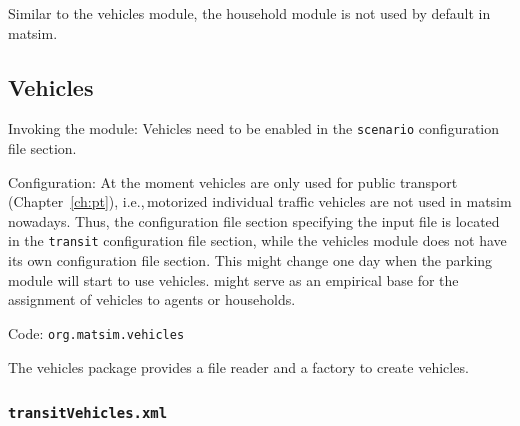 Similar to the vehicles module, the household module is not used by default in \gls{matsim}.

\subsection{Vehicles}
\label{sec:vehicles}


\begin{compactitem}
\item Invoking the module: Vehicles need to be enabled in the \lstinline|scenario| configuration file section.
\item Configuration: At the moment vehicles are only used for public transport (Chapter~\ref{ch:pt}), i.e.,\,motorized individual traffic vehicles are not used in \gls{matsim} nowadays. Thus, the configuration file section specifying the input file is located in the \lstinline|transit| configuration file section, while the vehicles module does not have its own configuration file section. 
%
This might change one day when the parking module will start to use vehicles. \citet[][]{JaeggiEtAl_TRR_2012} might serve as an empirical base for the assignment of vehicles to agents or households.
\item Code: \lstinline|org.matsim.vehicles|
\end{compactitem}

The vehicles package provides a file reader and a factory to create vehicles.

\subsubsection{\lstinline|transitVehicles.xml|}
\label{sec:inputdata:transitvehicles}

